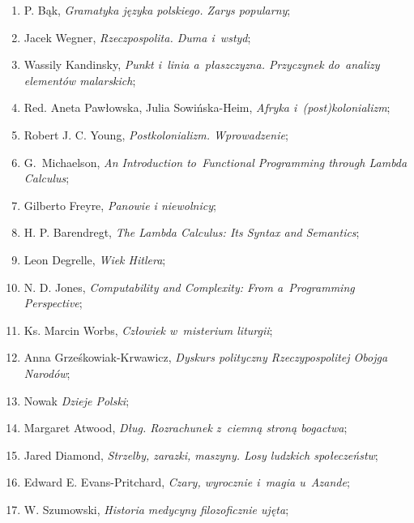 \documentclass[a4paper,11pt]{article}
\begin{document}
\begin{enumerate}
\item P. Bąk, \textit{Gramatyka języka polskiego. Zarys popularny};

\item Jacek Wegner, \textit{Rzeczpospolita. Duma i~wstyd};

\item Wassily Kandinsky, \textit{Punkt i~linia a~płaszczyzna. Przyczynek
    do~analizy elementów malarskich};

\item Red. Aneta Pawłowska, Julia Sowińska-Heim, \textit{Afryka
    i~(post)kolonializm};

\item Robert J. C. Young, \textit{Postkolonializm. Wprowadzenie};

\item G.~Michaelson, \textit{An Introduction to~Functional Programming
    through Lambda Calculus};

\item Gilberto Freyre, \textit{Panowie i niewolnicy};

\item H. P. Barendregt, \textit{The Lambda Calculus: Its Syntax and
    Semantics};

\item Leon Degrelle, \textit{Wiek Hitlera};

\item N. D. Jones, \textit{Computability and Complexity: From
    a~Programming Perspective};

\item Ks. Marcin Worbs, \textit{Człowiek w~misterium liturgii};

\item Anna Grześkowiak-Krwawicz, \textit{Dyskurs polityczny
    Rzeczypospolitej Obojga Narodów};

\item Nowak \textit{Dzieje Polski};

\item Margaret Atwood, \textit{Dług. Rozrachunek z~ciemną stroną
    bogactwa};

\item Jared Diamond, \textit{Strzelby, zarazki, maszyny. Losy ludzkich
    społeczeństw};

\item Edward E. Evans-Pritchard, \textit{Czary, wyrocznie i~magia
    u~Azande};

\item W. Szumowski, \textit{Historia medycyny filozoficznie ujęta};


\end{enumerate}
\end{document}
